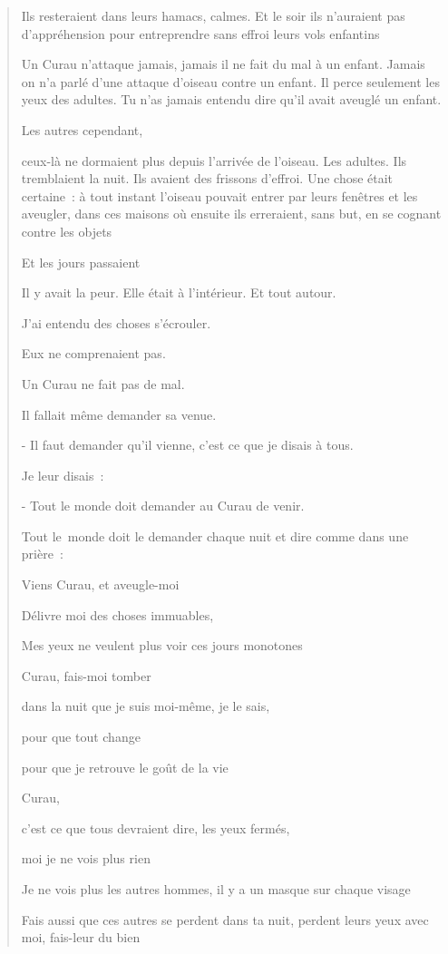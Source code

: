 \begin{quote}
Ils resteraient dans leurs hamacs, calmes. Et le soir ils n'auraient pas
d'appréhension pour entreprendre sans effroi leurs vols enfantins

Un Curau n'attaque jamais, jamais il ne fait du mal à un enfant. Jamais
on n'a parlé d'une attaque d'oiseau contre un enfant. Il perce seulement
les yeux des adultes. Tu n'as jamais entendu dire qu'il avait aveuglé un
enfant.

Les autres cependant,

ceux-là ne dormaient plus depuis l'arrivée de l'oiseau. Les adultes. Ils
tremblaient la nuit. Ils avaient des frissons d'effroi. Une chose était
certaine~: à tout instant l'oiseau pouvait entrer par leurs fenêtres et
les aveugler, dans ces maisons où ensuite ils erreraient, sans but, en
se cognant contre les objets

Et les jours passaient

Il y avait la peur. Elle était à l'intérieur. Et tout autour.

J'ai entendu des choses s'écrouler.

Eux ne comprenaient pas.

Un Curau ne fait pas de mal.

Il fallait même demander sa venue.

- Il faut demander qu'il vienne, c'est ce que je disais à tous.

Je leur disais~:

- Tout le monde doit demander au Curau de venir.

Tout le~monde doit le demander chaque nuit et dire comme dans une
prière~:

Viens Curau, et aveugle-moi

Délivre moi des choses immuables,

Mes yeux ne veulent plus voir ces jours monotones

Curau, fais-moi tomber

dans la nuit que je suis moi-même, je le sais,

pour que tout change

pour que je retrouve le goût de la vie

Curau,

c'est ce que tous devraient dire, les yeux fermés,

moi je ne vois plus rien

Je ne vois plus les autres hommes, il y a un masque sur chaque visage

Fais aussi que ces autres se perdent dans ta nuit, perdent leurs yeux
avec moi, fais-leur du bien


\end{quote}
